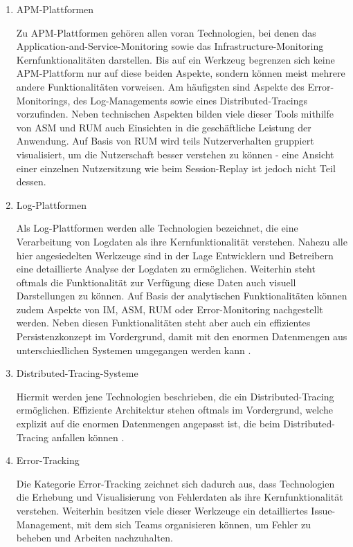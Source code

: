 \begin{enumerate}
	\item APM-Plattformen
	\par Zu APM-Plattformen gehören allen voran Technologien, bei denen das Application-and-Service-Monitoring sowie das Infrastructure-Monitoring Kernfunktionalitäten darstellen. Bis auf ein Werkzeug begrenzen sich keine APM-Plattform nur auf diese beiden Aspekte, sondern können meist mehrere andere Funktionalitäten vorweisen. Am häufigsten sind Aspekte des Error-Monitorings, des Log-Managements sowie eines Distributed-Tracings vorzufinden. Neben technischen Aspekten bilden viele dieser Tools mithilfe von ASM und RUM auch Einsichten in die geschäftliche Leistung der Anwendung. Auf Basis von RUM wird teils Nutzerverhalten gruppiert visualisiert, um die Nutzerschaft besser verstehen zu können - eine Ansicht einer einzelnen Nutzersitzung wie beim Session-Replay ist jedoch nicht Teil dessen.
	
	\item Log-Plattformen
	\par Als Log-Plattformen werden alle Technologien bezeichnet, die eine Verarbeitung von Logdaten als ihre Kernfunktionalität verstehen. Nahezu alle hier angesiedelten Werkzeuge sind in der Lage Entwicklern und Betreibern eine detaillierte Analyse der Logdaten zu ermöglichen. Weiterhin steht oftmals die Funktionalität zur Verfügung diese Daten auch visuell Darstellungen zu können. Auf Basis der analytischen Funktionalitäten können zudem Aspekte von IM, ASM, RUM oder Error-Monitoring nachgestellt werden. Neben diesen Funktionalitäten steht aber auch ein effizientes Persistenzkonzept im Vordergrund, damit mit den enormen Datenmengen aus unterschiedlichen Systemen umgegangen werden kann \cite{TowardsAutomatedLogParsingForLargeScale}.
	
	\item Distributed-Tracing-Systeme
	\par Hiermit werden jene Technologien beschrieben, die ein Distributed-Tracing ermöglichen. Effiziente Architektur stehen oftmals im Vordergrund, welche explizit auf die enormen Datenmengen angepasst ist, die beim Distributed-Tracing anfallen können \cite{DapperInfrastructure}.
	
	\item Error-Tracking
	\par Die Kategorie Error-Tracking zeichnet sich dadurch aus, dass Technologien die Erhebung und Visualisierung von Fehlerdaten als ihre Kernfunktionalität verstehen. Weiterhin besitzen viele dieser Werkzeuge ein detailliertes Issue-Management, mit dem sich Teams organisieren können, um Fehler zu beheben und Arbeiten nachzuhalten.
	

\end{enumerate}
